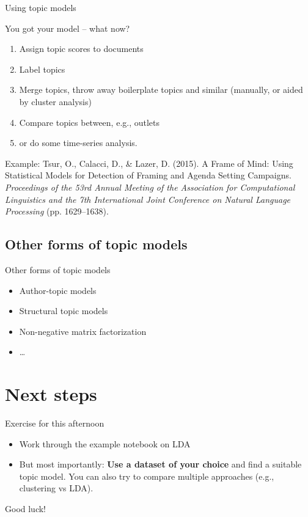 \documentclass[compress]{beamer}
\begin{document}
\begin{frame}{Using topic models}

You got your model -- what now?

\begin{enumerate}
	\item Assign topic scores to documents
	\item Label topics
	\item Merge topics, throw away boilerplate topics and similar (manually, or aided by cluster analysis)
	\item Compare topics between, e.g., outlets
	\item or do some time-series analysis.
\end{enumerate}


Example:
\tiny{Tsur, O., Calacci, D., \& Lazer, D. (2015). A Frame of Mind: Using Statistical Models for Detection of Framing and Agenda Setting Campaigns. \textit{Proceedings of the 53rd Annual Meeting of the Association for Computational Linguistics and the 7th International Joint Conference on Natural Language Processing} (pp. 1629–1638).}



\end{frame}



\subsection{Other forms of topic models}

\begin{frame}{Other forms of topic models}
\begin{itemize}
	\item Author-topic models
	\item Structural topic models
	\item Non-negative matrix factorization
	\item \ldots
\end{itemize}
\end{frame}




\section{Next steps}

\begin{frame}[plain]

  \begin{block}{Exercise for this afternoon}
    \footnotesize
  \begin{itemize}
  \item Work through the example notebook on LDA
  \item But most importantly: \textbf{Use a dataset of your choice} and find a suitable topic model. You can also try to compare multiple approaches (e.g., clustering vs LDA). 
    \end{itemize}
\end{block}



\end{frame}

\begin{frame}[standout]
Good luck!
\end{frame}
\end{document}
